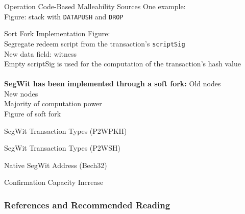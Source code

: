 \documentclass[]{beamer}
\begin{document}
\begin{frame}{Operation Code-Based Malleability Sources}
	One example:\\
	Figure: stack with \texttt{DATAPUSH} and \texttt{DROP}\\
\end{frame}

\begin{frame}{Sort Fork Implementation}
	Figure:\\
	Segregate redeem script from the transaction's \texttt{scriptSig}\\
	New data field: witness\\
	Empty scriptSig is used for the computation of the transaction's hash value\\
	\\
	\vspace{1.5em}
	\textbf{SegWit has been implemented through a soft fork:}
	Old nodes\\
	New nodes\\
	Majority of computation power\\
	Figure of soft fork
\end{frame}

\begin{frame}{SegWit Transaction Types (P2WPKH)}
	
\end{frame}

\begin{frame}{SegWit Transaction Types (P2WSH)}

\end{frame}

\begin{frame}{Native SegWit Address (Bech32)}

\end{frame}

\begin{frame}{Confirmation Capacity Increase}

\end{frame}

%

\begin{frame}%
\frametitle{References and Recommended Reading}
	
	
\end{frame}
\end{document}
